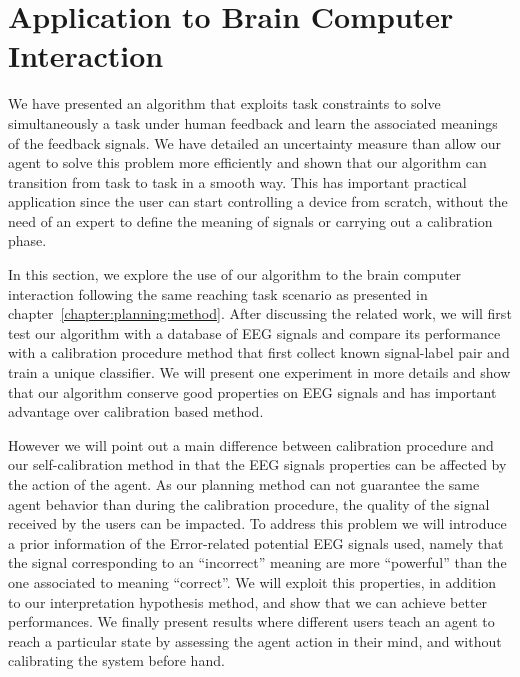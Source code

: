

\chapter{Application to Brain Computer Interaction}
\label{chapter:bci}
\minitoc


We have presented an algorithm that exploits task constraints to solve simultaneously a task under human feedback and learn the associated meanings of the feedback signals. We have detailed an uncertainty measure than allow our agent to solve this problem more efficiently and shown that our algorithm can transition from task to task in a smooth way. This has important practical application since the user can start controlling a device from scratch, without the need of an expert to define the meaning of signals or carrying out a calibration phase. 

In this section, we explore the use of our algorithm to the brain computer interaction following the same reaching task scenario as presented in chapter~\ref{chapter:planning:method}. After discussing the related work, we will first test our algorithm with a database of EEG signals and compare its performance with a calibration procedure method that first collect known signal-label pair and train a unique classifier. We will present one experiment in more details and show that our algorithm conserve good properties on EEG signals and has important advantage over calibration based method. 

However we will point out a main difference between calibration procedure and our self-calibration method in that the EEG signals properties can be affected by the action of the agent. As our planning method can not guarantee the same agent behavior than during the calibration procedure, the quality of the signal received by the users can be impacted. To address this problem we will introduce a prior information of the Error-related potential EEG signals used, namely that the signal corresponding to an ``incorrect'' meaning are more ``powerful'' than the one associated to meaning ``correct''. We will exploit this properties, in addition to our interpretation hypothesis method, and show that we can achieve better performances. We finally present results where different users teach an agent to reach a particular state by assessing the agent action in their mind, and without calibrating the system before hand.

